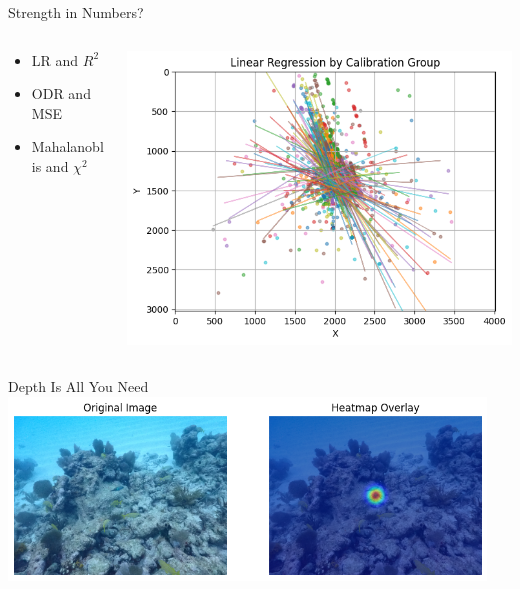 \begin{frame}{Strength in Numbers?}
  \begin{columns}
    \begin{column}{0.3\textwidth}
      \begin{itemize}
        \item LR and $R^2$
        \item ODR and MSE
        \item Mahalanoblis and $\chi^2$
      \end{itemize}
    \end{column}

    \begin{column}{0.7\textwidth}
      \raggedright    \includegraphics[height=0.7\textheight,keepaspectratio]{images/regression.png}
    \end{column}
  \end{columns}
\end{frame}

\begin{frame}{Depth Is All You Need}
    \centering
    \includegraphics[height=0.95\textheight,width=0.95\textwidth,keepaspectratio]{images/bullseye.png}
\end{frame}

